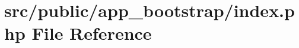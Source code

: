 \hypertarget{app__bootstrap_2index_8php}{}\section{src/public/app\+\_\+bootstrap/index.php File Reference}
\label{app__bootstrap_2index_8php}
